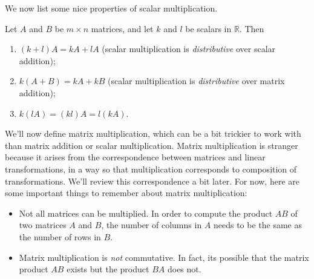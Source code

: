 \documentclass{ximera}
\begin{document}
We now list some nice properties of scalar multiplication.

\begin{proposition}
Let $A$ and $B$ be $m\times n$ matrices, and let $k$ and $l$ be scalars in $\mathbb{R}$. Then
\begin{enumerate}
\item $(k+l)A = kA+lA$ (scalar multiplication is \emph{distributive} over scalar addition);
\item $k(A+B)=kA+kB$ (scalar multiplication is \emph{distributive} over matrix addition);
\item $k(lA)=(kl)A = l(kA)$.
\end{enumerate}
\end{proposition}

We'll now define matrix multiplication, which can be a bit trickier to work with than matrix addition or scalar multiplication. Matrix multiplication is stranger because it arises from the correspondence between matrices and linear transformations, in a way so that multiplication corresponds to composition of transformations. We'll review this correspondence a bit later. For now, here are some important things to remember about matrix multiplication:
\begin{itemize}
\item Not all matrices can be multiplied. In order to compute the product $AB$ of two matrices $A$ and $B$, the number of columns in $A$ needs to be the same as the number of rows in $B$.
\item Matrix multiplication is \emph{not} commutative. In fact, its possible that the matrix product $AB$ exists but the product $BA$ does not.
\end{itemize}
\end{document}
